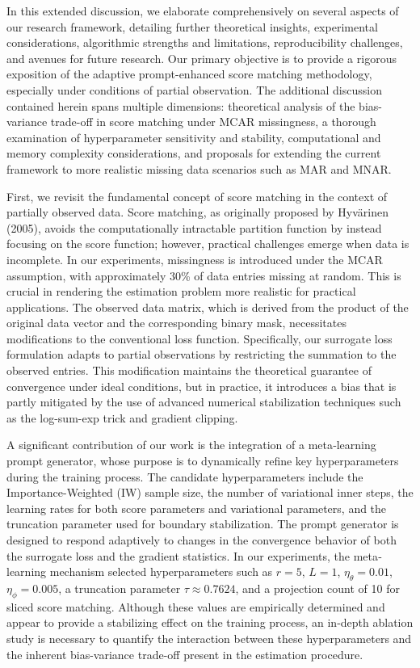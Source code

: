 \documentclass{article} %
\begin{document}
In this extended discussion, we elaborate comprehensively on several aspects of our research framework, detailing further theoretical insights, experimental considerations, algorithmic strengths and limitations, reproducibility challenges, and avenues for future research. Our primary objective is to provide a rigorous exposition of the adaptive prompt-enhanced score matching methodology, especially under conditions of partial observation. The additional discussion contained herein spans multiple dimensions: theoretical analysis of the bias-variance trade-off in score matching under MCAR missingness, a thorough examination of hyperparameter sensitivity and stability, computational and memory complexity considerations, and proposals for extending the current framework to more realistic missing data scenarios such as MAR and MNAR.

First, we revisit the fundamental concept of score matching in the context of partially observed data. Score matching, as originally proposed by Hyv\"arinen (2005), avoids the computationally intractable partition function by instead focusing on the score function; however, practical challenges emerge when data is incomplete. In our experiments, missingness is introduced under the MCAR assumption, with approximately 30\% of data entries missing at random. This is crucial in rendering the estimation problem more realistic for practical applications. The observed data matrix, which is derived from the product of the original data vector and the corresponding binary mask, necessitates modifications to the conventional loss function. Specifically, our surrogate loss formulation adapts to partial observations by restricting the summation to the observed entries. This modification maintains the theoretical guarantee of convergence under ideal conditions, but in practice, it introduces a bias that is partly mitigated by the use of advanced numerical stabilization techniques such as the log-sum-exp trick and gradient clipping.

A significant contribution of our work is the integration of a meta‐learning prompt generator, whose purpose is to dynamically refine key hyperparameters during the training process. The candidate hyperparameters include the Importance-Weighted (IW) sample size, the number of variational inner steps, the learning rates for both score parameters and variational parameters, and the truncation parameter used for boundary stabilization. The prompt generator is designed to respond adaptively to changes in the convergence behavior of both the surrogate loss and the gradient statistics. In our experiments, the meta‐learning mechanism selected hyperparameters such as \(r=5\), \(L=1\), \(\eta_\theta=0.01\), \(\eta_\phi=0.005\), a truncation parameter \(\tau \approx 0.7624\), and a projection count of 10 for sliced score matching. Although these values are empirically determined and appear to provide a stabilizing effect on the training process, an in‐depth ablation study is necessary to quantify the interaction between these hyperparameters and the inherent bias-variance trade-off present in the estimation procedure.
\end{document}
